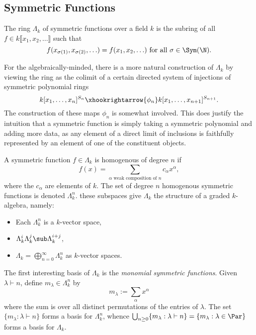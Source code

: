 \documentclass[12pt]{article}
\begin{document}
\subsection{Symmetric Functions}

\begin{definition}\label{def:symfunc}
    The ring $ \Lambda_{k} $ of symmetric functions over a field $ k $ is the subring of all $ f\in k\llbracket x_{1}, x_{2}, \ldots\rrbracket $ such that
    \[
      f(x_{\sigma(1)}, x_{\sigma(2)},\ldots) = f(x_{1},x_{2},\ldots) \text{ for all } \sigma\in \Sym(\N).
    \]
\end{definition}
\begin{remark}
    For the algebraically-minded, there is a more natural construction of $ \Lambda_{k} $ by viewing the ring as the colimit of a certain directed system of injections of symmetric polynomial rings
    \[
      k[x_{1},\ldots,x_{n}]^{S_{n}} \xhookrightarrow{\phi_{n}} k[x_{1},\ldots,x_{n+1}]^{S_{n+1}}.
    \]
    The construction of these maps $ \phi_{n} $ is somewhat involved. This does justify the intuition that a symmetric function is simply taking a symmetric polynomial and adding more data, as any element of a direct limit of inclusions is faithfully represented by an element of one of the constituent objects.

\end{remark}
\begin{definition}
    A symmetric function $ f\in \Lambda_{k} $ is homogenous of degree $ n $ if 
    \[
      f(x) = \sum_{\alpha\text{ weak composition of }n}c_{\alpha} x^{\alpha},
    \]
    where the $ c_{\alpha} $ are elements of $ k $. The set of degree $ n $ homogenous symmetric functions is denoted $ \Lambda_{k}^{n} $. these subspaces give $ \Lambda_{k} $ the structure of a graded $ k $-algebra, namely:
\end{definition}

\begin{itemize}
  \item Each $ \Lambda_{k}^{n} $ is a $ k $-vector space,
  \item $ \Lambda_{k}^{i} \Lambda_{k}^{j}\sub \Lambda_{k}^{i+j} $,
  \item $ \Lambda_{k}=\bigoplus_{n=0}^{\infty} \Lambda_{k}^{n} $ as $ k $-vector spaces.
\end{itemize}
The first interesting basis of $ \Lambda_{k} $ is the \textit{monomial symmetric functions}. Given $ \lambda\vdash n $, define $ m_{\lambda}\in \Lambda_{k}^{n} $ by 
\[
  m_{\lambda}:= \sum_{\alpha} x^{\alpha}
\]
where the sum is over all distinct permutations of the entries of $ \lambda $. The set $ \{m_{\lambda}: \lambda\vdash n\} $ forms a basis for $ \Lambda_{k}^{n} $, whence $\bigcup_{n\geq0} \{m_{\lambda}: \lambda\vdash n\} = \{m_{\lambda}: \lambda\in\Par\} $ forms a basis for $ \Lambda_{k} $.
\end{document}
